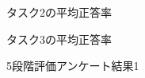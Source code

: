 \documentclass[syuuron]{kuee}
\begin{document}
		\begin{figure}
			\begin{center}
			\end{center}
			\caption{タスク2の平均正答率}
	  		\label{fig:res5}
		\end{figure}
		\begin{figure}
			\begin{center}
			\end{center}
			\caption{タスク3の平均正答率}
	  		\label{fig:res6}
		\end{figure}
		\begin{figure}
			\begin{center}
			\end{center}
			\caption{5段階評価アンケート結果1}
	  		\label{fig:res7}
		\end{figure}
\end{document}
